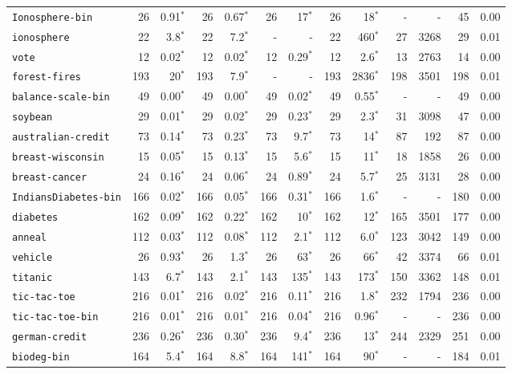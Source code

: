 \begin{tabular}{lrrrrrrrrrrrr}
\texttt{Ionosphere-bin} & 26 & 0.91$^*$ & 26 & 0.67$^*$ & 26 & 17$^*$ & 26 & 18$^*$ & - & - & 45 & 0.00\\
\texttt{ionosphere} & 22 & 3.8$^*$ & 22 & 7.2$^*$ & - & - & 22 & 460$^*$ & 27 & 3268 & 29 & 0.01\\
\texttt{vote} & 12 & 0.02$^*$ & 12 & 0.02$^*$ & 12 & 0.29$^*$ & 12 & 2.6$^*$ & 13 & 2763 & 14 & 0.00\\
\texttt{forest-fires} & 193 & 20$^*$ & 193 & 7.9$^*$ & - & - & 193 & 2836$^*$ & 198 & 3501 & 198 & 0.01\\
\texttt{balance-scale-bin} & 49 & 0.00$^*$ & 49 & 0.00$^*$ & 49 & 0.02$^*$ & 49 & 0.55$^*$ & - & - & 49 & 0.00\\
\texttt{soybean} & 29 & 0.01$^*$ & 29 & 0.02$^*$ & 29 & 0.23$^*$ & 29 & 2.3$^*$ & 31 & 3098 & 47 & 0.00\\
\texttt{australian-credit} & 73 & 0.14$^*$ & 73 & 0.23$^*$ & 73 & 9.7$^*$ & 73 & 14$^*$ & 87 & 192 & 87 & 0.00\\
\texttt{breast-wisconsin} & 15 & 0.05$^*$ & 15 & 0.13$^*$ & 15 & 5.6$^*$ & 15 & 11$^*$ & 18 & 1858 & 26 & 0.00\\
\texttt{breast-cancer} & 24 & 0.16$^*$ & 24 & 0.06$^*$ & 24 & 0.89$^*$ & 24 & 5.7$^*$ & 25 & 3131 & 28 & 0.00\\
\texttt{IndiansDiabetes-bin} & 166 & 0.02$^*$ & 166 & 0.05$^*$ & 166 & 0.31$^*$ & 166 & 1.6$^*$ & - & - & 180 & 0.00\\
\texttt{diabetes} & 162 & 0.09$^*$ & 162 & 0.22$^*$ & 162 & 10$^*$ & 162 & 12$^*$ & 165 & 3501 & 177 & 0.00\\
\texttt{anneal} & 112 & 0.03$^*$ & 112 & 0.08$^*$ & 112 & 2.1$^*$ & 112 & 6.0$^*$ & 123 & 3042 & 149 & 0.00\\
\texttt{vehicle} & 26 & 0.93$^*$ & 26 & 1.3$^*$ & 26 & 63$^*$ & 26 & 66$^*$ & 42 & 3374 & 66 & 0.01\\
\texttt{titanic} & 143 & 6.7$^*$ & 143 & 2.1$^*$ & 143 & 135$^*$ & 143 & 173$^*$ & 150 & 3362 & 148 & 0.01\\
\texttt{tic-tac-toe} & 216 & 0.01$^*$ & 216 & 0.02$^*$ & 216 & 0.11$^*$ & 216 & 1.8$^*$ & 232 & 1794 & 236 & 0.00\\
\texttt{tic-tac-toe-bin} & 216 & 0.01$^*$ & 216 & 0.01$^*$ & 216 & 0.04$^*$ & 216 & 0.96$^*$ & - & - & 236 & 0.00\\
\texttt{german-credit} & 236 & 0.26$^*$ & 236 & 0.30$^*$ & 236 & 9.4$^*$ & 236 & 13$^*$ & 244 & 2329 & 251 & 0.00\\
\texttt{biodeg-bin} & 164 & 5.4$^*$ & 164 & 8.8$^*$ & 164 & 141$^*$ & 164 & 90$^*$ & - & - & 184 & 0.01\\

\end{tabular}
